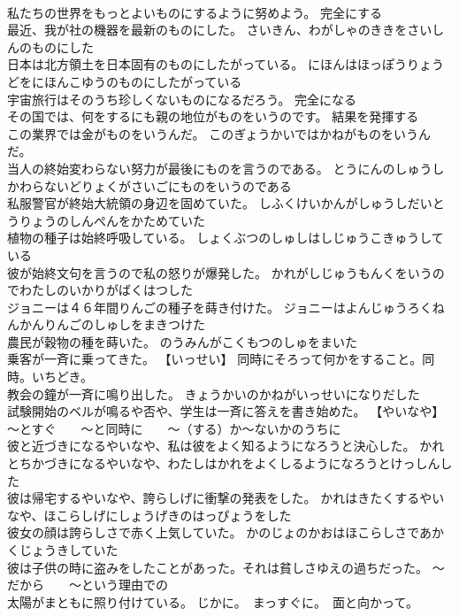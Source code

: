 \documentclass[8pt]{extreport}
\begin{document}
\begin{CJK}{UTF8}{min}
\\	私たちの世界をもっとよいものにするように努めよう。	完全にする
\\	最近、我が社の機器を最新のものにした。	さいきん、わがしゃのききをさいしんのものにした 
\\	日本は北方領土を日本固有のものにしたがっている。	にほんはほっぽうりょうどをにほんこゆうのものにしたがっている 
\\	宇宙旅行はそのうち珍しくないものになるだろう。	完全になる
\\	その国では、何をするにも親の地位がものをいうのです。	結果を発揮する
\\	この業界では金がものをいうんだ。	このぎょうかいではかねがものをいうんだ。 
\\	当人の終始変わらない努力が最後にものを言うのである。	とうにんのしゅうしかわらないどりょくがさいごにものをいうのである 
\\	私服警官が終始大統領の身辺を固めていた。	しふくけいかんがしゅうしだいとうりょうのしんぺんをかためていた 
\\	植物の種子は始終呼吸している。	しょくぶつのしゅしはしじゅうこきゅうしている 
\\	彼が始終文句を言うので私の怒りが爆発した。	かれがしじゅうもんくをいうのでわたしのいかりがばくはつした 
\\	ジョニーは４６年間りんごの種子を蒔き付けた。	ジョニーはよんじゅうろくねんかんりんごのしゅしをまきつけた 
\\	農民が穀物の種を蒔いた。	のうみんがこくもつのしゅをまいた 
\\	乗客が一斉に乗ってきた。	【いっせい】 同時にそろって何かをすること。同時。いちどき。
\\	教会の鐘が一斉に鳴り出した。	きょうかいのかねがいっせいになりだした 
\\	試験開始のベルが鳴るや否や、学生は一斉に答えを書き始めた。	【やいなや】 ～とすぐ　　～と同時に　　～（する）か～ないかのうちに
\\	彼と近づきになるやいなや、私は彼をよく知るようになろうと決心した。	かれとちかづきになるやいなや、わたしはかれをよくしるようになろうとけっしんした 
\\	彼は帰宅するやいなや、誇らしげに衝撃の発表をした。	かれはきたくするやいなや、ほこらしげにしょうげきのはっぴょうをした 
\\	彼女の顔は誇らしさで赤く上気していた。	かのじょのかおはほこらしさであかくじょうきしていた 
\\	彼は子供の時に盗みをしたことがあった。それは貧しさゆえの過ちだった。	～だから　　～という理由での
\\	太陽がまともに照り付けている。	じかに。　まっすぐに。　面と向かって。

\end{CJK}
\end{document}
